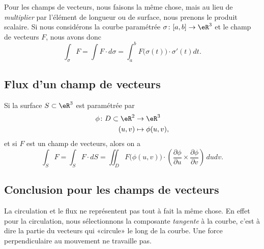 Pour les champs de vecteurs, nous faisons la même chose, mais au lieu de \emph{multiplier} par l'élément de longueur ou de surface, nous prenons le produit scalaire. Si nous considérons la courbe paramétrée $\sigma\colon \mathopen[ a , b \mathclose]\to \eR^3$ et le champ de vecteurs $F$, nous avons donc
\begin{equation}
    \int_{\sigma}F=\int F\cdot d\sigma=\int_a^bF\big( \sigma(t) \big)\cdot\sigma'(t)dt.
\end{equation}

\subsection{Flux d'un champ de vecteurs}

Si la surface $S\subset\eR^3$ est paramétrée par
\begin{equation}
    \begin{aligned}
        \phi\colon D\subset\eR^2&\to \eR^3 \\
        (u,v)&\mapsto \phi(u,v), 
    \end{aligned}
\end{equation}
et si $F$ est un champ de vecteurs, alors on a
\begin{equation}        \label{EqResIntFluxPhi}
    \int_SF=\int_S F\cdot dS=\iint_D F\big( \phi(u,v) \big)\cdot\left( \frac{ \partial \phi }{ \partial u }\times\frac{ \partial \phi }{ \partial v } \right)\,dudv.
\end{equation}

\subsection{Conclusion pour les champs de vecteurs}

La circulation et le flux ne représentent pas tout à fait la même chose. En effet pour la circulation, nous sélectionnons la composante \emph{tangente} à la courbe, c'est à dire la partie du vecteurs qui «circule» le long de la courbe. Une force perpendiculaire au mouvement ne travaille pas.

